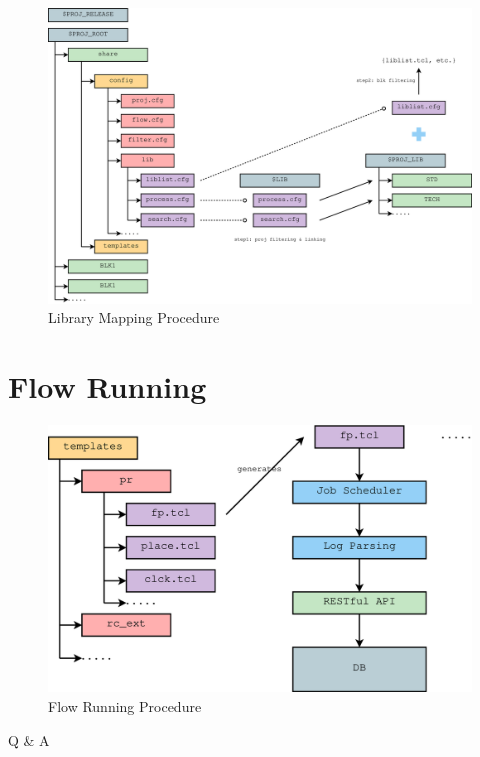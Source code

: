 \documentclass{beamer}
\begin{document}
\begin{frame}
  \begin{figure}
    \centering
    \includegraphics[width=1.00\linewidth]{lib_map_hier}
    \caption{Library Mapping Procedure}
  \end{figure}
\end{frame}

\section{Flow Running} %

\begin{frame}
  \begin{figure}
    \centering
    \includegraphics[width=0.80\linewidth]{flow_proc}
    \caption{Flow Running Procedure}
  \end{figure}
\end{frame}


\begin{frame}
  \Huge{\centerline{Q \& A}}
\end{frame}

\end{document}
